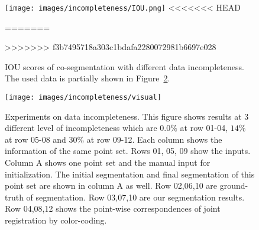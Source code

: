 \begin{figure}
	\centering
	\texttt{[image: images/incompleteness/IOU.png]}
<<<<<<< HEAD
	\caption{This figure shows how the data incompleteness affect the IOU score of co-segmentation. The data used in this experiment is partially shown in Figure~\ref{fig:incompleteness2}.}
=======
	\caption{IOU scores of co-segmentation with different data incompleteness. The used data is partially shown in Figure~\ref{fig:incompleteness2}. }
>>>>>>> f3b7495718a303c1bdafa2280072981b6697e028
	\label{fig:incompleteness}
\end{figure}
\begin{figure}
	\centering
	\texttt{[image: images/incompleteness/visual]}
	\caption{Experiments on data incompleteness. This figure shows results at 3 different level of incompleteness which are $0.0\%$ at row 01-04, $14\%$ at row 05-08 and $30\%$ at row 09-12. Each column shows the information of the same point set. Rows 01, 05, 09 show the inputs. 
	Column A shows one point set and the manual input for initialization. 
	The initial segmentation and final segmentation of this point set are shown in column A as well.
	Row 02,06,10 are ground-truth of segmentation. Row 03,07,10 are our segmentation results. 
	Row 04,08,12 shows the point-wise correspondences of joint registration by color-coding.}
	\label{fig:incompleteness2}
\end{figure}
